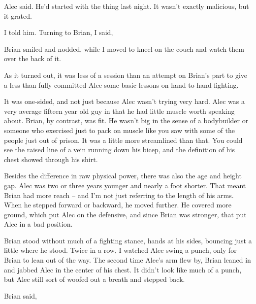 Alec said. He'd started with the  thing last night. It wasn't exactly malicious, but it grated.

 I told him. Turning to Brian, I said, 

Brian smiled and nodded, while I moved to kneel on the couch and watch them over the back of it.

As it turned out, it was less of a  session than an attempt on Brian's part to give a less than fully committed Alec some basic lessons on hand to hand fighting.

It was one-sided, and not just because Alec wasn't trying very hard. Alec was a very average fifteen year old guy in that he had little muscle worth speaking about. Brian, by contrast, was fit. He wasn't big in the sense of a bodybuilder or someone who exercised just to pack on muscle like you saw with some of the people just out of prison. It was a little more streamlined than that. You could see the raised line of a vein running down his bicep, and the definition of his chest showed through his shirt.

Besides the difference in raw physical power, there was also the age and height gap. Alec was two or three years younger and nearly a foot shorter. That meant Brian had more reach -- and I'm not just referring to the length of his arms. When he stepped forward or backward, he moved further. He covered more ground, which put Alec on the defensive, and since Brian was stronger, that put Alec in a bad position.

Brian stood without much of a fighting stance, hands at his sides, bouncing just a little where he stood. Twice in a row, I watched Alec swing a punch, only for Brian to lean out of the way. The second time Alec's arm flew by, Brian leaned in and jabbed Alec in the center of his chest. It didn't look like much of a punch, but Alec still sort of woofed out a breath and stepped back.

 Brian said, 



